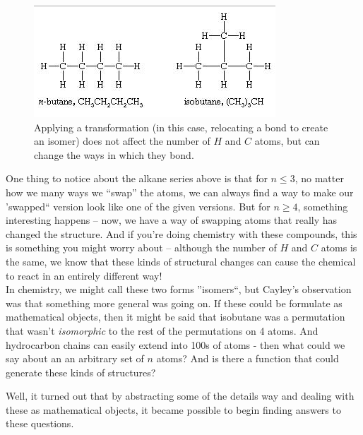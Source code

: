 \documentclass[a4paper,10pt]{report}
\begin{document}
\begin{figure}[H]
	\begin{centering}
	\begin{center}
	\includegraphics[width=\linewidth]{./hydrocarbons.png}
	\caption{Applying a transformation (in this case, relocating a bond to create an isomer) does not affect the number of $H$ and $C$ atoms, but can change the ways in which they bond.}
	\label{fig:hydrocarbons}
	\end{center}
	\par\end{centering}
\end{figure}

One thing to notice about the alkane series above is that for $n\leq 3$, no matter how we many ways we ``swap'' the atoms, we can always find a way to make our 'swapped`` version look like one of the given versions. But for $n \geq 4$, something interesting happens -- now, we have a way of swapping atoms that really has changed the structure. And if you're doing chemistry with these compounds, this is something you might worry about -- although the number of $H$ and $C$ atoms is the same, we know that these kinds of structural changes can cause the chemical to react in an entirely different way!\\

In chemistry, we might call these two forms ''isomers``, but Cayley's observation was that something more general was going on. If these could be formulate as mathematical objects, then it might be said that isobutane was a permutation that wasn't \textit{isomorphic} to the rest of the permutations on 4 atoms. And hydrocarbon chains can easily extend into 100s of atoms - then what could we say about an an arbitrary set of $n$ atoms? And is there a function that could generate these kinds of structures?

Well, it turned out that by abstracting some of the details way and dealing with these as mathematical objects, it became possible to begin finding answers to these questions.
\end{document}
